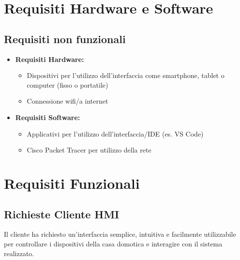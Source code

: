 \documentclass[a4paper,12pt]{article}
\begin{document}
\section{Requisiti Hardware e Software}
\subsection{Requisiti non funzionali}
\begin{itemize}
    \item \textbf{Requisiti Hardware:}
    \begin{itemize}
        \item Dispositivi per l'utilizzo dell'interfaccia come smartphone, tablet o computer (fisso o portatile)
        \item Connessione wifi/a internet
    \end{itemize}
    
    \item \textbf{Requisiti Software:}
    \begin{itemize}
        \item Applicativi per l'utilizzo dell'interfaccia/IDE (es. VS Code)
        \item Cisco Packet Tracer per utilizzo della rete
    \end{itemize}
\end{itemize}

\section{Requisiti Funzionali}
\subsection{Richieste Cliente HMI}
Il cliente ha richiesto un'interfaccia semplice, intuitiva e facilmente utilizzabile per controllare i dispositivi della casa domotica e interagire con il sistema realizzato.
\end{document}
